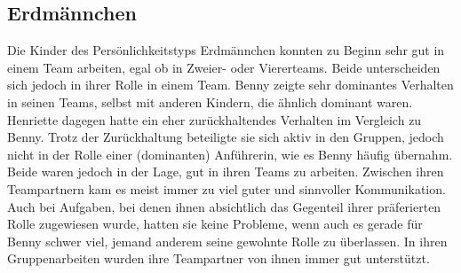 \subsection{Erdmännchen}
Die Kinder des Persönlichkeitstyps Erdmännchen konnten zu Beginn sehr gut in einem Team arbeiten, egal ob in Zweier- oder Viererteams. Beide unterscheiden sich jedoch in ihrer Rolle in einem Team. Benny zeigte sehr dominantes Verhalten in seinen Teams, selbst mit anderen Kindern, die ähnlich dominant waren. Henriette dagegen hatte ein eher zurückhaltendes Verhalten im Vergleich zu Benny. Trotz der Zurückhaltung beteiligte sie sich aktiv in den Gruppen, jedoch nicht in der Rolle einer (dominanten) Anführerin, wie es Benny häufig übernahm. Beide waren jedoch in der Lage, gut in ihren Teams zu arbeiten. Zwischen ihren Teampartnern kam es meist immer zu viel guter und sinnvoller Kommunikation. Auch bei Aufgaben, bei denen ihnen absichtlich das Gegenteil ihrer präferierten Rolle zugewiesen wurde, hatten sie keine Probleme, wenn auch es gerade für Benny schwer viel, jemand anderem seine gewohnte Rolle zu überlassen. In ihren Gruppenarbeiten wurden ihre Teampartner von ihnen immer gut unterstützt.

